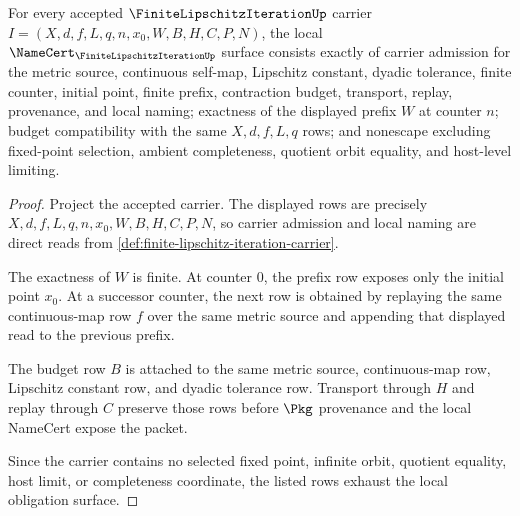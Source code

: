 \begin{theorem}
\label{thm:finite-lipschitz-iteration-namecert-obligations}
For every accepted $\FiniteLipschitzIterationUp$ carrier $I=(X,d,f,L,q,n,x_0,W,B,H,C,P,N)$, the local $\NameCert_{\FiniteLipschitzIterationUp}$ surface consists exactly of carrier admission for the metric source, continuous self-map, Lipschitz constant, dyadic tolerance, finite counter, initial point, finite prefix, contraction budget, transport, replay, provenance, and local naming; exactness of the displayed prefix $W$ at counter $n$; budget compatibility with the same $X,d,f,L,q$ rows; and nonescape excluding fixed-point selection, ambient completeness, quotient orbit equality, and host-level limiting.
\end{theorem}
\begin{proof}
Project the accepted carrier. The displayed rows are precisely $X,d,f,L,q,n,x_0,W,B,H,C,P,N$, so carrier admission and local naming are direct reads from \autoref{def:finite-lipschitz-iteration-carrier}.

The exactness of $W$ is finite. At counter $0$, the prefix row exposes only the initial point $x_0$. At a successor counter, the next row is obtained by replaying the same continuous-map row $f$ over the same metric source and appending that displayed read to the previous prefix.

The budget row $B$ is attached to the same metric source, continuous-map row, Lipschitz constant row, and dyadic tolerance row. Transport through $H$ and replay through $C$ preserve those rows before $\Pkg$ provenance and the local NameCert expose the packet.

Since the carrier contains no selected fixed point, infinite orbit, quotient equality, host limit, or completeness coordinate, the listed rows exhaust the local obligation surface.
\end{proof}

